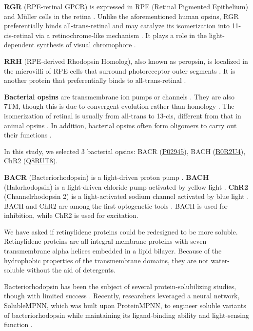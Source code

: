 \documentclass[fleqn,10pt]{manuscript}
\begin{document}
\textbf{RGR} (RPE-retinal GPCR) is expressed in RPE (Retinal Pigmented Epithelium) and M\"uller cells in the retina \citep{Shen_1994}. Unlike the aforementioned human opsins, RGR preferentially binds all-trans-retinal and may catalyze its isomerization into 11-cis-retinal via a retinochrome-like mechanism \citep{Radu_2008}. It plays a role in the light-dependent synthesis of visual chromophore \citep{Radu_2008}.

\textbf{RRH} (RPE-derived Rhodopsin Homolog), also known as peropsin, is localized in the microvilli of RPE cells that surround photoreceptor outer segments \citep{Sun_1997}. It is another protein that preferentially binds to all-trans-retinal \citep{Cook_2017}. 

\textbf{Bacterial opsins} are transmembrane ion pumps or channels \citep{Findlay_1986, Zhang_2011}. They are also 7TM, though this is due to convergent evolution rather than homology \citep{Yee_2013}. The isomerization of retinal is usually from all-trans to 13-cis, different from that in animal opsins \citep{Findlay_1986, Spudich_2000}. In addition, bacterial opsins often form oligomers to carry out their functions \citep{Taguchi_2023, Gmelin_2007, Shan_2024}.

In this study, we selected 3 bacterial opsins: BACR (\href{https://www.uniprot.org/uniprotkb/P02945/entry}{P02945}), BACH (\href{https://www.uniprot.org/uniprotkb/B0R2U4/entry}{B0R2U4}), ChR2 (\href{https://www.uniprot.org/uniprotkb/Q8RUT8/entry}{Q8RUT8}). 

\textbf{BACR} (Bacteriorhodopsin) is a light-driven proton pump \citep{Oesterhelt_1971}. \textbf{BACH} (Halorhodopsin) is a light-driven chloride pump activated by yellow light \citep{Schobert_1982}. \textbf{ChR2} (Channelrhodopsin 2) is a light-activated sodium channel activated by blue light \citep{Nagel_2003}. BACH and ChR2 are among the first optogenetic tools \citep{Zhang_2007, Han_2007}. BACH is used for inhibition, while ChR2 is used for excitation. 

We have asked if retinylidene proteins could be redesigned to be more soluble. Retinylidene proteins are all integral membrane proteins with seven transmembrane alpha helices embedded in a lipid bilayer. Because of the hydrophobic properties of the transmembrane domains, they are not water-soluble without the aid of detergents. 

Bacteriorhodopsin has been the subject of several protein-solubilizing studies, though with limited success \citep{Sirokman_1993, Gibas_1997, Mitra_2002}. Recently, researchers leveraged a neural network, SolubleMPNN, which was built upon ProteinMPNN, to engineer soluble variants of bacteriorhodopsin while maintaining its ligand-binding ability and light-sensing function \citep{Nikolaev_2024}.
\end{document}
